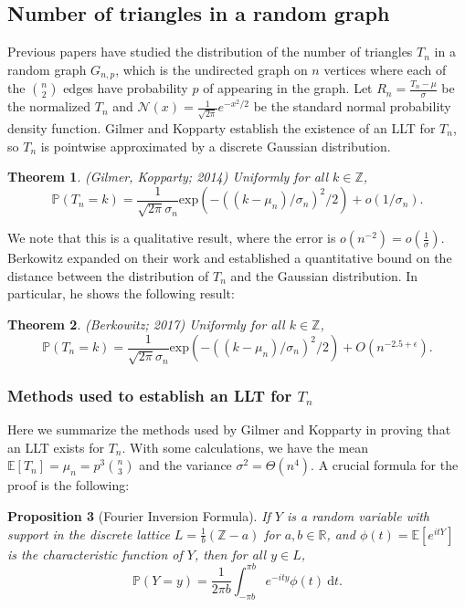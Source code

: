 \documentclass[12pt]{article} %
\newcommand{\f}[2]{\frac{#1}{#2}}
\newcommand{\p}[1]{\left(#1\right)}
\newcommand{\abs}[1]{\left\lvert#1\right\rvert}
\renewcommand{\P}{\mathbb{P}}
\newcommand{\E}{\mathbb{E}}
\newcommand{\bbr}{\mathbb{R}}
\newcommand{\Z}{\mathbb{Z}}
\renewcommand{\d}{\mathrm{d}}
\newtheorem{thm}{Theorem}[section]
\newtheorem{prop}[thm]{Proposition}
\theoremstyle{definition}
\theoremstyle{definition}
\begin{document}
\subsection{Number of triangles in a random graph}
Previous papers have studied the distribution of the number of triangles $T_n$ in a random graph $G_{n,p}$, which is the undirected graph on $n$ vertices where each of the $\binom{n}{2}$ edges have probability $p$ of appearing in the graph. Let $R_n = \frac{T_n-\mu}{\sigma}$ be the normalized $T_n$ and $\mathcal{N}(x) = \frac{1}{\sqrt{2\pi}}e^{-x^2/2}$ be the standard normal probability density function. Gilmer and Kopparty \cite{GilmerKopparty14} establish the existence of an LLT for $T_n$, so $T_n$ is pointwise approximated by a discrete Gaussian distribution. 
\begin{thm}{(Gilmer, Kopparty; 2014)}
Uniformly for all $k \in \Z$,
\[ \P(T_n = k) = \f{1}{\sqrt{2\pi}\sigma_n} \mathrm{exp}\p{-((k-\mu_n)/\sigma_n)^2/2} + o(1/\sigma_n). \]
\end{thm}

We note that this is a qualitative result, where the error is $o(n^{-2}) = o(\frac{1}{\sigma})$. Berkowitz \cite{Berkowitz17} expanded on their work and established a quantitative bound on the distance between the distribution of $T_n$ and the Gaussian distribution. In particular, he shows the following result:

\begin{thm}{(Berkowitz; 2017})
Uniformly for all $k \in \Z$,
\[ \P(T_n = k) = \f{1}{\sqrt{2\pi}\sigma_n} \mathrm{exp}\p{-((k-\mu_n)/\sigma_n)^2/2} + O(n^{-2.5+\epsilon}). \]
\end{thm}

\subsubsection{Methods used to establish an LLT for $T_n$}
Here we summarize the methods used by Gilmer and Kopparty \cite{GilmerKopparty14} in proving that an LLT exists for $T_n$.
With some calculations, we have the mean $\E[T_n] = \mu_n = p^3{\binom{n}{3}}$ and the variance $\sigma^2 = \Theta(n^4).$ 
A crucial formula for the proof is the following:
\begin{prop}[Fourier Inversion Formula]
If $Y$ is a random variable with support in the discrete lattice $L = \frac{1}{b}(\Z - a)$ for $a,b \in \bbr$, and $\phi(t) = \E[e^{itY}]$ is the characteristic function of $Y$, then for all $y \in L$, 
\[ \P(Y = y) = \frac{1}{2\pi b} \int_{-\pi b}^{\pi b} e^{-ity}\phi(t)\ \d t.
\]
\end{prop}
\end{document}
